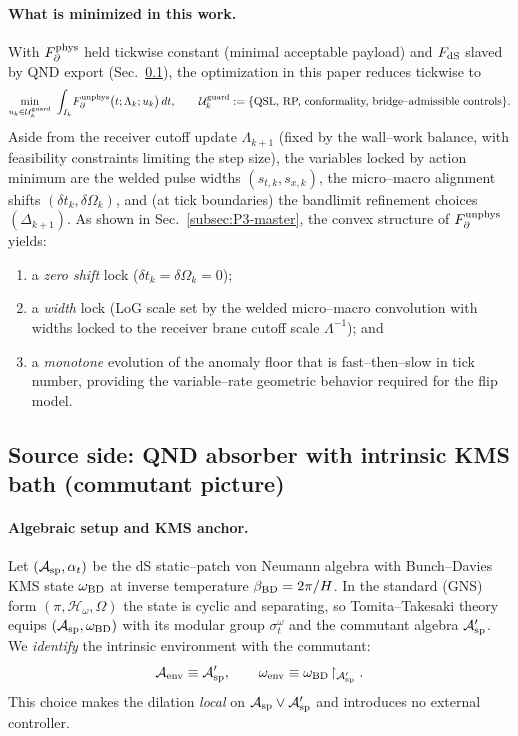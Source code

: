 \documentclass[10pt]{article}
\theoremstyle{definition}
\theoremstyle{plain}
\begin{document}
\paragraph{What is minimized in this work.}\label{par:uom-main-026}
With $F_\partial^{\rm phys}$ held tickwise constant (minimal acceptable payload)
and $F_{\rm dS}$ slaved by QND export (Sec.~\ref{subsec:source-qnd-commutant}), the optimization in
this paper reduces tickwise to
\begin{equation}
\label{eq:P3-reduced}
\min_{u_k\in\mathcal U_k^{\rm guard}}
\ \int_{I_k}\!F_\partial^{\rm unphys}\big(t;\Lambda_k;u_k\big)\,dt,
\qquad
\mathcal U_k^{\rm guard}:=\{\text{QSL, RP, conformality, bridge–admissible controls}\}.
\end{equation}
Aside from the receiver cutoff update $\Lambda_{k+1}$ (fixed by the wall--work balance, with feasibility
constraints limiting the step size), the variables locked by action minimum are the welded pulse widths
$(s_{t,k},s_{x,k})$, the micro–macro alignment shifts $(\delta t_k,\delta\Omega_k)$, and
(at tick boundaries) the bandlimit refinement choices $(\Delta_{k\!+\!1})$. As shown in
Sec.~\ref{subsec:P3-master}, the convex
structure of $F_\partial^{\rm unphys}$ yields: 
\begin{enumerate}[label=(\roman*)]
    \item a \emph{zero shift} lock
($\delta t_k=\delta\Omega_k=0$);
\item a \emph{width} lock (LoG scale set by the welded
micro–macro convolution with widths locked to the receiver brane cutoff scale $\Lambda^{-1}$); and
\item a \emph{monotone} evolution of the anomaly floor that is fast–then–slow in tick
number, providing the variable–rate geometric behavior required for the flip model.
\end{enumerate}


\subsection{Source side: QND absorber with intrinsic KMS bath (commutant picture)}
\label{subsec:source-qnd-commutant}

\paragraph{Algebraic setup and KMS anchor.}\label{par:uom-main-027}
Let $(\mathcal A_{\rm sp},\alpha_t)$ be the dS static–patch von Neumann algebra with
Bunch–Davies KMS state $\omega_{\rm BD}$ at inverse temperature $\beta_{\rm BD}=2\pi/H$.
In the standard (GNS) form $(\pi,\mathcal H_\omega,\Omega)$ the state is cyclic and
separating, so Tomita–Takesaki theory equips $(\mathcal A_{\rm sp},\omega_{\rm BD})$ with
its modular group $\sigma_t^\omega$ and the commutant algebra $\mathcal A_{\rm sp}'$.
We \emph{identify} the intrinsic environment with the commutant:
\[
\mathcal A_{\rm env}\equiv\mathcal A_{\rm sp}',\qquad
\omega_{\rm env}\equiv\omega_{\rm BD}\!\restriction_{\mathcal A_{\rm sp}'}.
\]
This choice makes the dilation \emph{local} on $\mathcal A_{\rm sp}\vee\mathcal A_{\rm sp}'$
and introduces no external controller.
\end{document}
